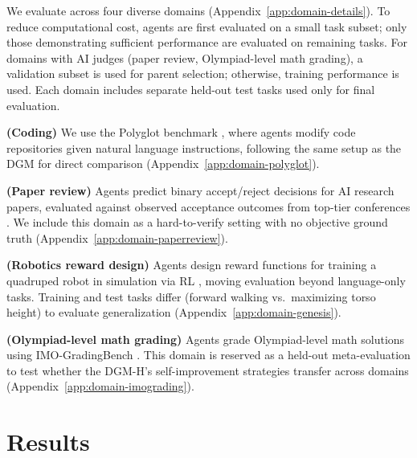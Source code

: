 We evaluate across four diverse domains (Appendix~\ref{app:domain-details}). To reduce computational cost, agents are first evaluated on a small task subset; only those demonstrating sufficient performance are evaluated on remaining tasks. For domains with AI judges (paper review, Olympiad-level math grading), a validation subset is used for parent selection; otherwise, training performance is used. Each domain includes separate held-out test tasks used only for final evaluation.

\textbf{(Coding)} We use the Polyglot benchmark \citep{gauthier2024polyglot}, where agents modify code repositories given natural language instructions, following the same setup as the DGM \citep{zhang2025darwin} for direct comparison (Appendix~\ref{app:domain-polyglot}).

\textbf{(Paper review)} Agents predict binary accept/reject decisions for AI research papers, evaluated against observed acceptance outcomes from top-tier conferences \citep{zhao2026apres}. We include this domain as a hard-to-verify setting with no objective ground truth (Appendix~\ref{app:domain-paperreview}).

\textbf{(Robotics reward design)} Agents design reward functions for training a quadruped robot in simulation via RL \citep{genesis2024}, moving evaluation beyond language-only tasks. Training and test tasks differ (forward walking vs.\ maximizing torso height) to evaluate generalization (Appendix~\ref{app:domain-genesis}).

\textbf{(Olympiad-level math grading)} Agents grade Olympiad-level math solutions using IMO-GradingBench \citep{luong2025towards}. This domain is reserved as a held-out meta-evaluation to test whether the DGM-H's self-improvement strategies transfer across domains (Appendix~\ref{app:domain-imograding}).

\section{Results}
\label{sec:results}

